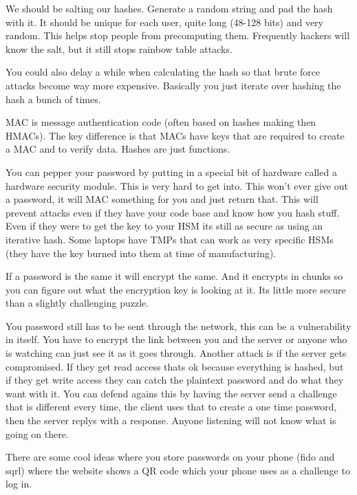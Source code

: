 \documentclass{article}
\begin{document}

We should be salting our hashes. Generate a random string and pad the hash with it. It should be unique for each user, quite long (48-128 bits) and very random. This helps stop people from precomputing them. Frequently hackers will know the salt, but it still stops rainbow table attacks. 


You could also delay a while when calculating the hash so that brute force attacks become way more expensive. Basically you just iterate over hashing the hash a bunch of times. 


MAC is message authentication code (often based on hashes making then HMACs). The key difference is that MACs have keys that are required to create a MAC and to verify data. Hashes are just functions. 


You can pepper your password by putting in a special bit of hardware called a hardware security module. This is very hard to get into. This won't ever give out a password, it will MAC something for you and just return that. This will prevent attacks even if they have your code base and know how you hash stuff. Even if they were to get the key to your HSM its still as secure as using an iterative hash. Some laptops have TMPs that can work as very specific HSMs (they have the key burned into them at time of manufacturing). 


If a password is the same it will encrypt the same. And it encrypts in chunks so you can figure out what the encryption key is looking at it. Its little more secure than a slightly challenging puzzle.


You password still has to be sent through the network, this can be a vulnerability in itself. You have to encrypt the link between you and the server or anyone who is watching can just see it as it goes through. Another attack is if the server gets compromised. If they get read access thats ok because everything is hashed, but if they get write access they can catch the plaintext password and do what they want with it. You can defend agains this by having the server send a challenge that is different every time, the client uses that to create a one time password, then the server replys with a response. Anyone listening will not know what is going on there. 

There are some cool ideas where you store passwords on your phone (fido and sqrl) where the website shows a QR code which your phone uses as a challenge to log in.
\end{document}
